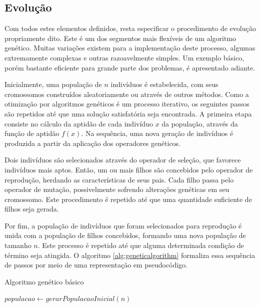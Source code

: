 \documentclass[12pt]{article}
\begin{document}
\subsection{Evolução} \label{sec:evolution}

Com todos estes elementos definidos, resta especificar o procedimento de evolução propriamente dito. Este é um dos segmentos mais flexíveis de um algoritmo genético. Muitas variações existem para a implementação deste processo, algumas extremamente complexas e outras razoavelmente simples. Um exemplo básico, porém bastante eficiente para grande parte dos problemas, é apresentado adiante.

Inicialmente, uma população de $n$ indivíduos é estabelecida, com seus cromossomos construídos aleatoriamente ou através de outros métodos.
Como a otimização por algoritmos genéticos é um processo iterativo, os seguintes passos são repetidos até que uma solução satisfatória seja encontrada. A primeira etapa consiste no cálculo da aptidão de cada indivíduo $x$ da população, através da função de aptidão $f(x)$. Na sequência, uma nova geração de indivíduos é produzida a partir da aplicação dos operadores genéticos.

Dois indivíduos são selecionados através do operador de seleção, que favorece indivíduos mais aptos. Então, um ou mais filhos são concebidos pelo operador de reprodução, herdando as características de seus pais. Cada filho passa pelo operador de mutação, possivelmente sofrendo alterações genéticas em seu cromossomo. Este procedimento é repetido até que uma quantidade suficiente de filhos seja gerada.

Por fim, a população de indivíduos que foram selecionados para reprodução é unida com a população de filhos concebidos, formando uma nova população de tamanho $n$. Este processo é repetido até que alguma determinada condição de término seja atingida. O algoritmo \ref{alg:geneticalgorithm} formaliza essa sequência de passos por meio de uma representação em pseudocódigo.

\begin{algorithm}[ht]
  \small
  \DontPrintSemicolon
  \caption{Algoritmo genético básico}
  \label{alg:geneticalgorithm}
  \BlankLine
  $populacao \leftarrow gerarPopulacaoInicial(n)$ \;
  \BlankLine
  \BlankLine
\end{algorithm}
\end{document}
